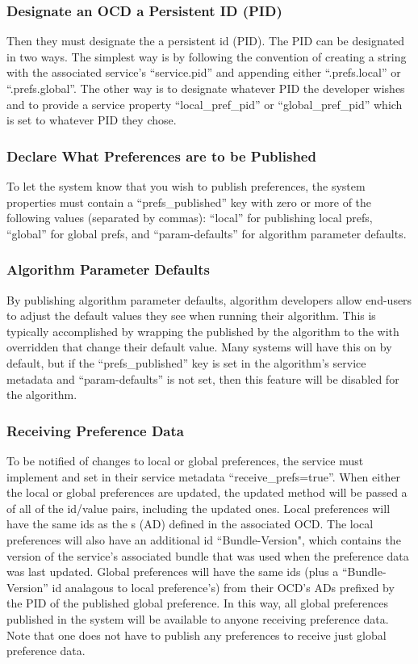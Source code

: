 \subsubsection*{Designate an OCD a Persistent ID (PID)} Then they must designate
the  a persistent id (PID). The PID can be
designated in two ways. The simplest way is by following the convention of
creating a string with the associated service's ``service.pid'' and appending
either ``.prefs.local'' or ``.prefs.global''. The other way is to designate
whatever PID the developer wishes and to provide a service property
``local\_pref\_pid'' or ``global\_pref\_pid'' which is set to whatever PID they
chose.

\subsubsection*{Declare What Preferences are to be Published} To let the system
know that you wish to publish preferences, the system properties must contain a
``prefs\_published'' key with zero or more of the following values (separated by
commas): ``local'' for publishing local prefs, ``global'' for global prefs, and
``param-defaults'' for algorithm parameter defaults.

\subsubsection*{Algorithm Parameter Defaults} By publishing algorithm parameter
defaults, algorithm developers allow end-users to adjust the default values they
see when running their algorithm. This is typically accomplished by wrapping the
 published by the algorithm to the
 with overridden  that
change their default value. Many systems will have this on by default, but if
the ``prefs\_published'' key is set in the algorithm's service metadata and
``param-defaults'' is not set, then this feature will be disabled for the
algorithm.

\subsubsection*{Receiving Preference Data} To be notified of changes to local or
global preferences, the service must implement
 and set in their service
metadata ``receive\_prefs=true''. When either the local or global preferences are updated,
the updated method will be passed a  of all of the id/value
pairs, including the updated ones. Local preferences will have the same ids as
the s (AD) defined in the associated OCD. The local
preferences will also have an additional id ``Bundle-Version", which contains the
version of the service's associated bundle that was used when the preference data
was last updated. Global preferences will have the same ids (plus a
``Bundle-Version'' id analagous to local preference's) from their OCD's ADs
prefixed by the PID of the published global preference. In this way, all global
preferences published in the system will be available to anyone receiving
preference data. Note that one does not have to publish any preferences to
receive just global preference data.
